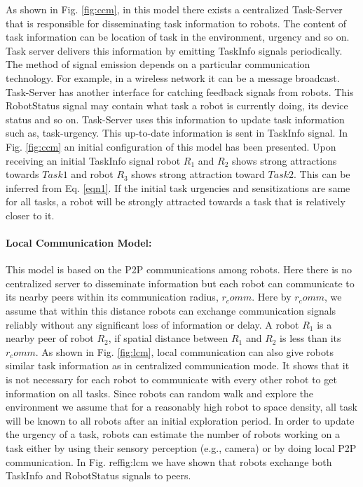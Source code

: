 \documentclass{llncs}
\begin{document}
As shown in Fig. \ref{fig:ccm}, in this model there exists a centralized Task-Server that is responsible for disseminating task information to robots. The content of  task information can be   location of task in the environment, urgency and so on. Task server delivers this information by emitting TaskInfo signals periodically. The method of signal emission depends on a particular communication technology. For example, in a wireless network it can be a message broadcast.
Task-Server has another interface for catching feedback signals from robots. This RobotStatus signal may contain what task a robot is currently doing, its device status and so on.  Task-Server  uses this information to update task information such as, task-urgency. This up-to-date information is sent in TaskInfo signal.
In Fig. \ref{fig:ccm} an initial configuration of this model has been presented. Upon receiving an initial TaskInfo signal robot $R_1$ and $R_2$ shows  strong attractions towards $Task1$ and robot $R_3$ shows strong attraction toward $Task2$. This can be inferred from Eq. \ref{eqn1}. If the initial task urgencies and sensitizations are same for all tasks, a robot will be strongly attracted towards a task that is relatively closer to it.

\paragraph{Local Communication Model:}

This model is based on the P2P communications among robots. Here there is no centralized server to disseminate information but each robot can communicate to its nearby peers within its communication radius, $r_comm$. Here by $r_comm$, we assume that within this distance robots can exchange communication signals reliably without any significant loss of information or delay. A robot $R_1$ is a nearby peer  of robot $R_2$, if spatial distance between $R_1$ and $R_2$ is less than its $r_comm$. 
As shown in Fig. \ref{fig:lcm}, local communication can also give robots similar task information as in centralized communication mode. It shows that  it is not necessary for each robot to communicate with every other robot to get information on all tasks. Since robots can random walk  and explore the environment we assume that for a reasonably high robot to space density, all task will be known to all robots after an initial exploration period. 
In order to update the urgency of a task, robots can estimate the number of robots working on a task either by using their sensory perception (e.g., camera)  or by doing local P2P communication. In Fig. ref{fig:lcm} we have shown that robots exchange both TaskInfo and RobotStatus signals to peers.
\end{document}
